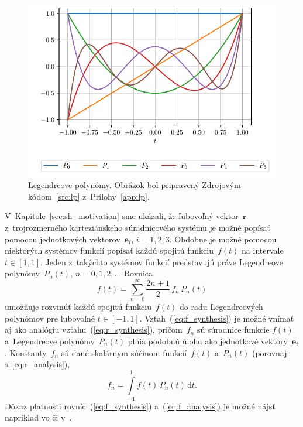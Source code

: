 \documentclass[a4paper,12pt]{book}
\newcommand{\diff}{\mathrm d}
\let\vec\mathbf
\begin{document}
\begin{figure}[bt]
\centering
\includegraphics{./fig-legendre-polynomials.pdf}
\caption{Legendreove polynómy.  Obrázok bol pripravený Zdrojovým
kódom~\ref{src:lp} z~Prílohy~\ref{app:lp}.}
\label{fig:lp}
\end{figure}

V~Kapitole~\ref{sec:sh_motivation} sme ukázali, že ľubovoľný vektor~$\vec r$
z~trojrozmerného karteziánskeho súradnicového systému je možné popísať pomocou
jednotkových vektorov~$\vec e_i$, $i = 1, 2, 3$.  Obdobne je možné pomocou
niektorých systémov funkcií popísať každú spojitú funkciu~$f(t)$ na intervale
$t \in [1, 1]$.  Jeden z~takýchto systémov funkcií predstavujú práve
Legendreove polynómy~$P_n(t)$, $n = 0, 1, 2, \dots$  Rovnica
%
\begin{equation}
\label{eq:f_synthesis}
f(t) = \sum_{n = 0}^\infty \frac{2n + 1}{2} \, f_n \, P_n(t)
\end{equation}
%
umožňuje rozvinúť každú spojitú funkciu~$f(t)$ do radu Legendreových polynómov
pre ľubovoľné $t \in [-1, 1]$.  Vzťah~(\ref{eq:f_synthesis}) je možné vnímať aj
ako analógiu vzťahu~(\ref{eq:r_synthesis}), pričom~$f_n$ sú súradnice funkcie
$f(t)$ a~Legendreove polynómy~$P_n(t)$ plnia podobnú úlohu ako jednotkové
vektory~$\vec e_i$.  Konštanty~$f_n$ sú dané skalárnym súčinom funkcií~$f(t)$
a~$P_n(t)$ (porovnaj s~\ref{eq:r_analysis}),
%
\begin{equation}
\label{eq:f_analysis}
f_n = \int\limits_{-1}^1 f(t) \, P_n(t) \, \diff t{.}
\end{equation}
%
Dôkaz platnosti rovníc~(\ref{eq:f_synthesis}) a~(\ref{eq:f_analysis}) je možné 
nájsť napríklad vo \textcite{Freeden2009} či 
v~\textcite{SansoGeoidDetermination}.
\end{document}
